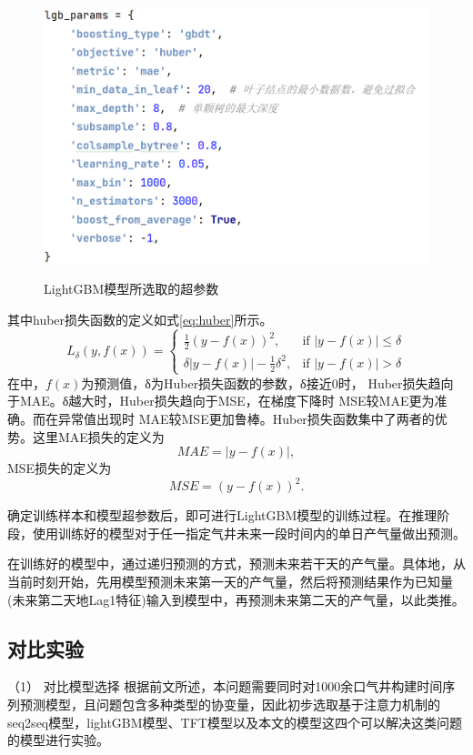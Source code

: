\begin{figure}[H]
    \centering
    \caption{LightGBM模型所选取的超参数}
    \includegraphics{figure/LightGBMsuper.png}
    \label{fig:LightGBMSuper}
\end{figure}
其中huber损失函数的定义如式\eqref{eq:huber}所示。
\begin{equation}
    L_{\delta}(y, f(x)) = 
        \begin{cases} 
        \frac{1}{2}(y - f(x))^2, & \text{if } |y - f(x)| \leq \delta \\
        \delta|y - f(x)| - \frac{1}{2}\delta^2, & \text{if } |y - f(x)| > \delta
        \end{cases}
    \label{eq:huber}
\end{equation}
在中，\(f(x)\)为预测值，δ为Huber损失函数的参数，δ接近0时，
Huber损失趋向于MAE。δ越大时，Huber损失趋向于MSE，在梯度下降时 MSE较MAE更为准确。而在异常值出现时 MAE较MSE更加鲁棒。Huber损失函数集中了两者的优势。这里MAE损失的定义为
\[MAE = |y - f(x)|,\]
MSE损失的定义为
\[MSE = (y - f(x))^2.\]

确定训练样本和模型超参数后，即可进行LightGBM模型的训练过程。在推理阶段，使用训练好的模型对于任一指定气井未来一段时间内的单日产气量做出预测。

在训练好的模型中，通过递归预测的方式，预测未来若干天的产气量。具体地，从当前时刻开始，先用模型预测未来第一天的产气量，然后将预测结果作为已知量(未来第二天地Lag1特征)输入到模型中，再预测未来第二天的产气量，以此类推。
\subsection{对比实验}
（1） 对比模型选择
根据前文所述，本问题需要同时对1000余口气井构建时间序列预测模型，且问题包含多种类型的协变量，因此初步选取基于注意力机制的seq2seq模型，lightGBM模型、TFT模型以及本文的模型这四个可以解决这类问题的模型进行实验。

